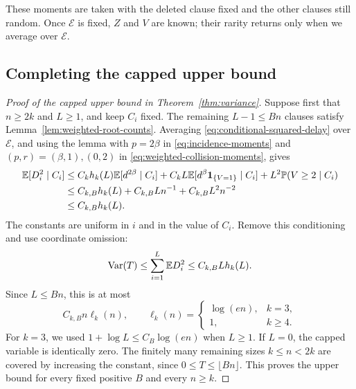 These moments are taken with the deleted clause fixed and the other
clauses still random.  Once \(\mathcal E\) is fixed, \(Z\) and \(V\)
are known; their rarity returns only when we average over
\(\mathcal E\).

\subsection{Completing the capped upper bound}

\begin{proof}[Proof of the capped upper bound in Theorem~\ref{thm:variance}]
Suppose first that \(n\ge2k\) and \(L\ge1\), and keep \(C_i\) fixed.
The remaining \(L-1\le Bn\) clauses satisfy
Lemma~\ref{lem:weighted-root-counts}.  Averaging
\eqref{eq:conditional-squared-delay} over \(\mathcal E\), and using
the lemma with \(p=2\beta\) in \eqref{eq:incidence-moments} and
\((p,r)=(\beta,1),(0,2)\) in \eqref{eq:weighted-collision-moments},
gives
\begin{align*}
 \mathbb E[D_i^2\mid C_i]
 &\le C_kh_k(L)\mathbb E[d^{2\beta}\mid C_i]
       +C_kL\mathbb E[d^\beta\mathbf1_{\{V=1\}}\mid C_i]
       +L^2\mathbb P(V\ge2\mid C_i)\\
 &\le C_{k,B}h_k(L)+C_{k,B}Ln^{-1}
                         +C_{k,B}L^2n^{-2}\\
 &\le C_{k,B}h_k(L).
\end{align*}
The constants are uniform in \(i\) and in the value of \(C_i\).
Remove this conditioning and use coordinate omission:
\[
 \operatorname{Var}(T)\le\sum_{i=1}^{L}\mathbb E D_i^2
 \le C_{k,B}Lh_k(L).
\]
Since \(L\le Bn\), this is at most
\[
 C_{k,B}n\ell_k(n),\qquad
 \ell_k(n)=
 \begin{cases}
 \log(en),&k=3,\\
 1,&k\ge4.
 \end{cases}
\]
For \(k=3\), we used \(1+\log L\le C_B\log(en)\) when \(L\ge1\).
If \(L=0\), the capped variable is identically zero.  The finitely
many remaining sizes \(k\le n<2k\) are covered by increasing the
constant, since \(0\le T\le\lfloor Bn\rfloor\).  This proves the
upper bound for every fixed positive \(B\) and every \(n\ge k\).
\end{proof}
